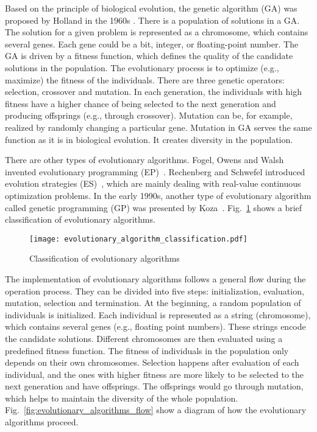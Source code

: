 Based on the principle of biological evolution, the genetic algorithm (GA) was proposed by Holland in the 1960s \cite{Halland_1992}. There is a population of solutions in a GA. The solution for a given problem is represented as a chromosome, which contains several genes. Each gene could be a bit, integer, or floating-point number. The GA is driven by a fitness function, which defines the quality of the candidate solutions in the population. The evolutionary process is to optimize (e.g., maximize) the fitness of the individuals. There are three genetic operators: selection, crossover and mutation.  In each generation, the individuals with high fitness have a higher chance of being selected to the next generation and producing offsprings (e.g., through crossover). Mutation can be, for example, realized by randomly changing a particular gene. Mutation in GA serves the same function as it is in biological evolution. It creates diversity in the population. 

There are other types of evolutionary algorithms. Fogel, Owens and Walsh invented evolutionary programming (EP)~\cite{Fogel1966}. Rechenberg and Schwefel introduced evolution strategies (ES)~\cite{Rechenberg1994, Schwefel1995}, which are mainly dealing with real-value continuous optimization problems. In the early 1990s, another type of evolutionary algorithm called genetic programming (GP) was presented by Koza~\cite{Koza1992}. Fig.~\ref{fig:evolutionary_algorithm_classification} shows a brief classification of evolutionary algorithms. 

\begin{figure}[htbp]
  \centering
  \texttt{[image: evolutionary\_algorithm\_classification.pdf]}
  \caption{Classification of evolutionary algorithms}
  \label{fig:evolutionary_algorithm_classification}
\end{figure}

The implementation of evolutionary algorithms follows a general flow during the operation process. They can be divided into five steps: initialization, evaluation, mutation, selection and termination. At the beginning, a random population of individuals is initialized. Each individual is represented as a string (chromosome), which contains several genes (e.g., floating point numbers). These strings encode the candidate solutions. Different chromosomes are then evaluated using a predefined fitness function. The fitness of individuals in the population only depends on their own chromosomes. Selection happens after evaluation of each individual, and the ones with higher fitness are more likely to be selected to the next generation and have offsprings. The offsprings would go through mutation, which helps to maintain the diversity of the whole population.  Fig.~\ref{fig:evolutionary_algorithms_flow} show a diagram of how the evolutionary algorithms proceed. 

